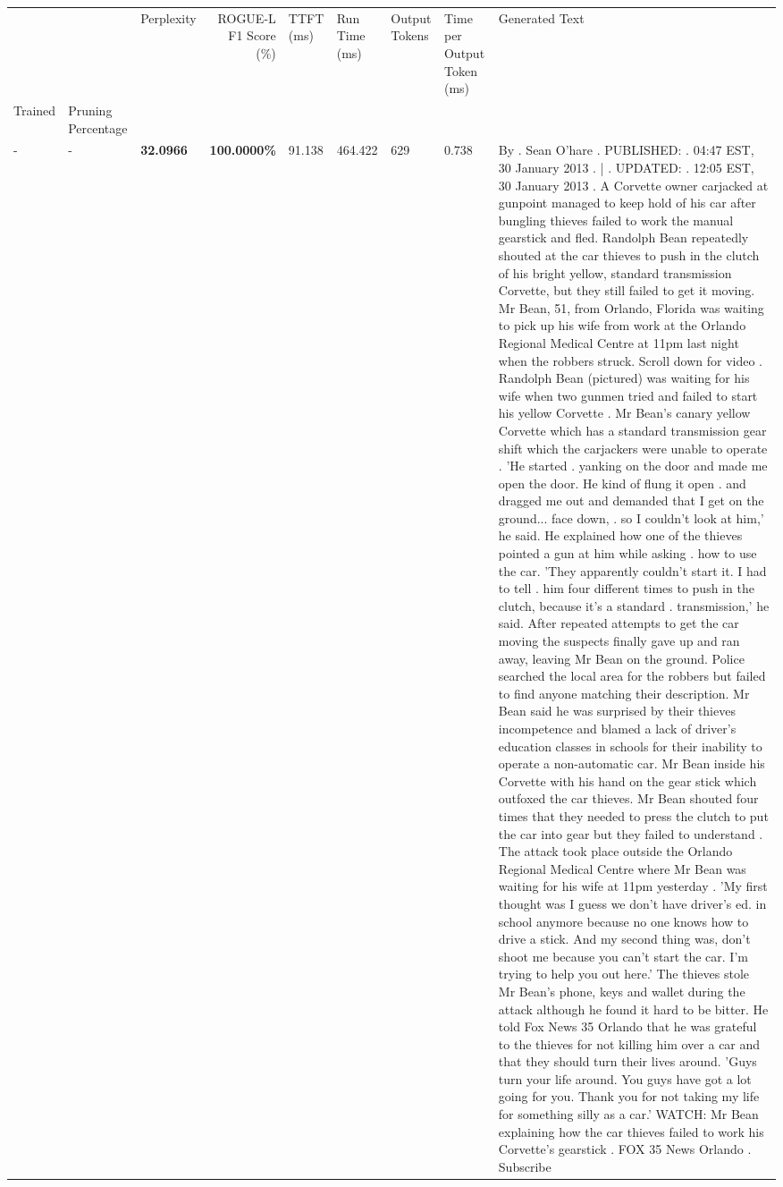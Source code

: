 \begin{table}[H]
\label{tab:evaluation-pipeline-1}
\begin{tabular}{lllrlllll}
\toprule
 &  & Perplexity & ROGUE-L F1 Score (\%) & TTFT (ms) & Run Time (ms) & Output Tokens & Time per Output Token (ms) & Generated Text \\
Trained & Pruning Percentage &  &  &  &  &  &  &  \\
\midrule
- & - & \bfseries 32.0966 & \bfseries 100.0000\% & 91.138 & 464.422 & 629 & 0.738 & By . Sean O'hare . PUBLISHED: . 04:47 EST, 30 January 2013 . | . UPDATED: . 12:05 EST, 30 January 2013 . A Corvette owner carjacked at gunpoint managed to keep hold of his car after bungling thieves failed to work the manual gearstick and fled. Randolph Bean repeatedly shouted at the car thieves to push in the clutch of his bright yellow, standard transmission Corvette, but they still failed to get it moving. Mr Bean, 51, from Orlando, Florida was waiting to pick up his wife from work at the Orlando Regional Medical Centre at 11pm last night when the robbers struck. Scroll down for video . Randolph Bean (pictured) was waiting for his wife when two gunmen tried and failed to start his yellow Corvette . Mr Bean's canary yellow Corvette which has a standard transmission gear shift which the carjackers were unable to operate . 'He started . yanking on the door and made me open the door. He kind of flung it open . and dragged me out and demanded that I get on the ground... face down, . so I couldn't look at him,' he said. He explained how one of the thieves pointed a gun at him while asking . how to use the car. 'They apparently couldn't start it. I had to tell . him four different times to push in the clutch, because it's a standard . transmission,' he said. After repeated attempts to get the car moving the suspects finally gave up and ran away, leaving Mr Bean on the ground. Police searched the local area for the robbers but failed to find anyone matching their description. Mr Bean said he was surprised by their thieves incompetence and blamed a lack of driver's education classes in schools for their inability to operate a non-automatic car. Mr Bean inside his Corvette with his hand on the gear stick which outfoxed the car thieves. Mr Bean shouted four times that they needed to press the clutch to put the car into gear but they failed to understand . The attack took place outside the Orlando Regional Medical Centre where Mr Bean was waiting for his wife at 11pm yesterday . 'My first thought was I guess we don't have driver's ed. in school anymore because no one knows how to drive a stick. And my second thing was, don't shoot me because you can't start the car. I'm trying to help you out here.' The thieves stole Mr Bean's phone, keys and wallet during the attack although he found it hard to be bitter. He told Fox News 35 Orlando that he was grateful to the thieves for not killing him over a car and that they should turn their lives around. 'Guys turn your life around. You guys have got a lot going for you. Thank you for not taking my life for something silly as a car.' WATCH: Mr Bean explaining how the car thieves failed to work his Corvette's gearstick . FOX 35 News Orlando . Subscribe \\

\end{tabular}
\end{table}
